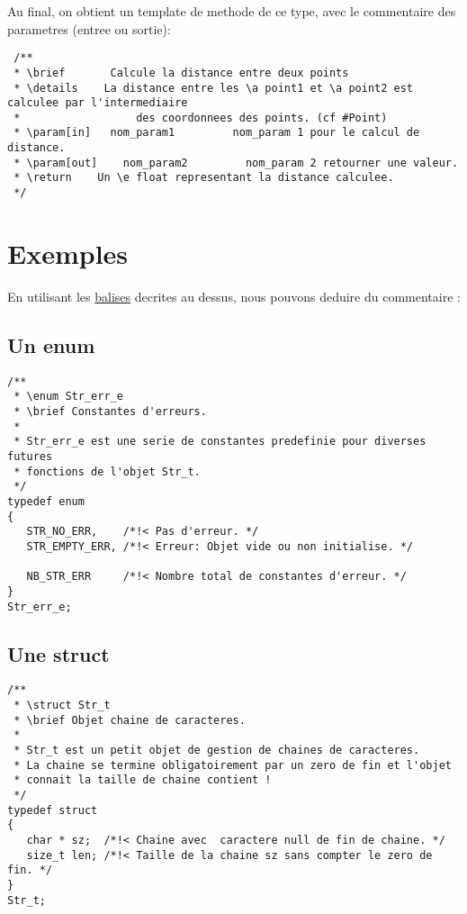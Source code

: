  Au final, on obtient un template de methode de ce type, avec le commentaire des parametres (entree ou sortie): 
 \begin{lstlisting}
 /**
 * \brief       Calcule la distance entre deux points
 * \details    La distance entre les \a point1 et \a point2 est calculee par l'intermediaire
 *                  des coordonnees des points. (cf #Point)
 * \param[in]   nom_param1         nom_param 1 pour le calcul de distance.
 * \param[out]    nom_param2         nom_param 2 retourner une valeur.
 * \return    Un \e float representant la distance calculee.
 */
\end{lstlisting}


\section{Exemples}

En utilisant les \hyperref[balises]{balises} decrites au dessus, nous pouvons deduire du commentaire :

\subsection{Un enum}

 \begin{lstlisting}
/**
 * \enum Str_err_e
 * \brief Constantes d'erreurs.
 *
 * Str_err_e est une serie de constantes predefinie pour diverses futures 
 * fonctions de l'objet Str_t.
 */
typedef enum
{
   STR_NO_ERR,    /*!< Pas d'erreur. */
   STR_EMPTY_ERR, /*!< Erreur: Objet vide ou non initialise. */
 
   NB_STR_ERR     /*!< Nombre total de constantes d'erreur. */
}
Str_err_e;
\end{lstlisting}

\subsection{Une struct} 
\begin{lstlisting}
/**
 * \struct Str_t
 * \brief Objet chaine de caracteres.
 *
 * Str_t est un petit objet de gestion de chaines de caracteres. 
 * La chaine se termine obligatoirement par un zero de fin et l'objet 
 * connait la taille de chaine contient !
 */
typedef struct
{
   char * sz;  /*!< Chaine avec  caractere null de fin de chaine. */
   size_t len; /*!< Taille de la chaine sz sans compter le zero de fin. */
}
Str_t;
\end{lstlisting}

